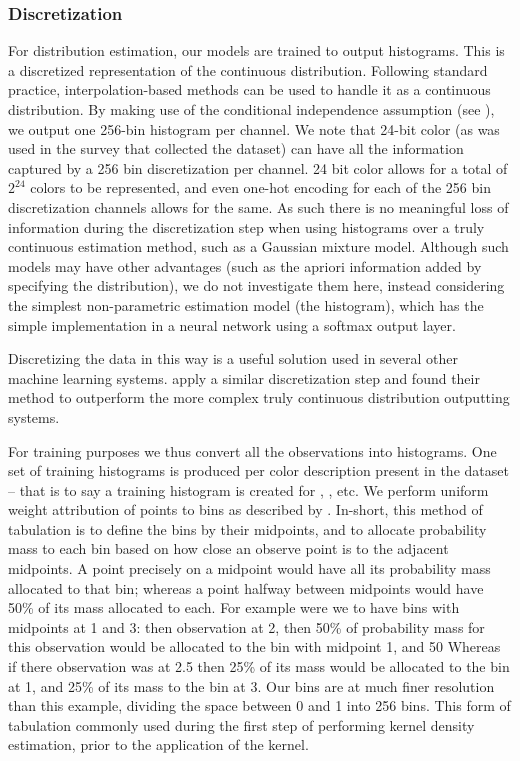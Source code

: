 \subsubsection{Discretization} \label{sec:discretization}
For distribution estimation, our models are trained to output histograms.
This is a discretized representation of the continuous distribution.
Following standard practice, interpolation-based methods can be used to handle it as a continuous distribution.
By making use of the conditional independence assumption (see ), we output one 256-bin histogram per channel.
We note that 24-bit color (as was used in the survey that collected the dataset) can have all the information captured by a 256 bin discretization  per channel.
24 bit color allows for a total of $2^{24}$ colors to be represented, and even one-hot encoding for each of the 256 bin discretization channels allows for the same.
As such there is no meaningful loss of information during the discretization step when using histograms over a truly continuous estimation method, such as a Gaussian mixture model.
Although such models may have other advantages (such as the apriori information added by specifying the distribution), we do not investigate them here, instead considering the simplest non-parametric estimation model (the histogram), which has the simple implementation in a neural network using a softmax output layer.

Discretizing the data in this way is a useful solution used in several other machine learning systems.
\textcite{oord2016pixel, DBLP:journals/corr/OordDZSVGKSK16} apply a similar discretization step and found their method to outperform the more complex truly continuous distribution outputting systems.

For training purposes we thus convert all the observations into histograms.
One set of training histograms is produced per color description present in the dataset -- that is to say a training histogram is created for , ,  etc.
We perform uniform weight attribution of points to bins as described by \textcite{jones1984remark}.
In-short, this method of tabulation is to define the bins by their midpoints, and to allocate probability mass to each bin based on how close an observe point is to the adjacent midpoints.
A point precisely on a midpoint would have all its probability mass allocated to that bin;
whereas a point halfway between midpoints would have 50\% of its mass allocated to each.
For example were we to have bins with midpoints at 1 and 3:
then observation at 2, then 50\% of probability mass for this observation would be allocated to the bin with midpoint 1, and 50%
Whereas if there observation was at 2.5 then 25\% of its mass would be allocated to the bin at 1, and 25\% of its mass to the bin at 3.
Our bins are at much finer resolution than this example, dividing the space between 0 and 1 into 256 bins.
This form of tabulation commonly used during the first step of performing kernel density estimation, prior to the application of the kernel.


